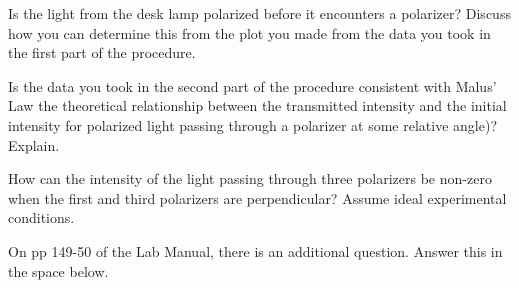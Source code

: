 Is the light from the desk lamp polarized before it encounters a polarizer? Discuss
how you can determine this from the plot you made from the data you took in the first
part of the procedure.
\vspace*{2cm}

\noindent
Is the data you took in the second part of the procedure consistent with Malus' Law the theoretical relationship between 
the transmitted intensity and the initial intensity for polarized light passing
through a polarizer at some relative angle)?
Explain.
\vspace*{2cm}

\noindent
How can the intensity of the light passing through three polarizers be non-zero when
the first and third polarizers are perpendicular? Assume ideal experimental conditions.
\vspace*{2cm}

\noindent
On pp 149-50 of the Lab Manual, there is an additional question. Answer this in the
space below.



\renewcommand{\thesection}{\thechapter.\arabic{section}}



